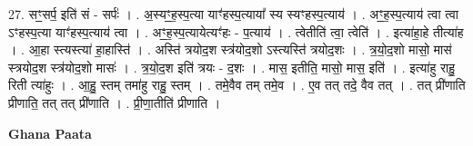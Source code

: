 \documentclass[17pt]{extarticle}
\begin{document}
27. सꣳ॒॒सर्प॒ इति॑ सं - सर्पः॑ । . अ॒स्यꣳ॒॒ह॒स्प॒त्या याꣳ॑हस्प॒त्याया᳚ स्य स्यꣳहस्प॒त्याय॑ । . अꣳ॒॒ह॒स्प॒त्याय॑ त्वा त्वा ऽꣳहस्प॒त्या याꣳ॑हस्प॒त्याय॑ त्वा । . अꣳ॒॒ह॒स्प॒त्यायेत्यꣳ॑हः - प॒त्याय॑ । . त्वेतीति॑ त्वा॒ त्वेति॑ । . इत्या॑हा॒हे तीत्या॑ह । . आ॒हा स्त्यस्त्या॑ हा॒हास्ति॑ । . अस्ति॑ त्रयोद॒श स्त्र॑योद॒शो ऽस्त्यस्ति॑ त्रयोद॒शः । . त्र॒यो॒द॒शो मासो॒ मास॑ स्त्रयोद॒श स्त्र॑योद॒शो मासः॑ । . त्र॒यो॒द॒श इति॑ त्रयः - द॒शः । . मास॒ इतीति॒ मासो॒ मास॒ इति॑ । . इत्या॑हु राहु॒ रिती त्या॑हुः । . आ॒हु॒ स्तम् तमा॑हु राहु॒ स्तम् । . तमे॒वैव तम् तमे॒व । . ए॒व तत् तदे॒ वैव तत् । . तत् प्री॑णाति प्रीणाति॒ तत् तत् प्री॑णाति । . प्री॒णा॒तीति॑ प्रीणाति । \newline

\textbf{Ghana Paata } \newline
\end{document}
